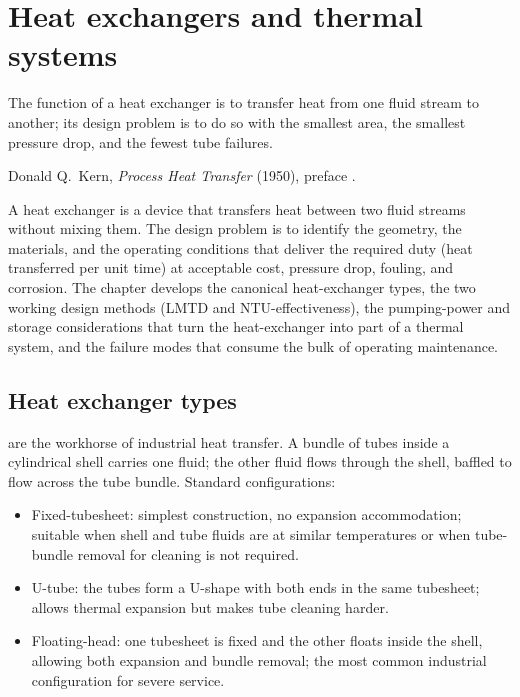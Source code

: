\chapter{Heat exchangers and thermal systems}
\label{vol04:ch06}

\epigraph{The function of a heat exchanger is to transfer heat from one
fluid stream to another; its design problem is to do so with the
smallest area, the smallest pressure drop, and the fewest tube
failures.}{Donald Q.\ Kern, \emph{Process Heat Transfer} (1950),
preface \cite[p.~v]{text:kern-process-heat}.}


\noindent
A heat exchanger is a device that transfers heat between two fluid
streams without mixing them. The design problem is to identify the
geometry, the materials, and the operating conditions that deliver
the required duty (heat transferred per unit time) at acceptable
cost, pressure drop, fouling, and corrosion. The chapter develops the
canonical heat-exchanger types, the two working design methods
(LMTD and NTU-effectiveness), the pumping-power and storage
considerations that turn the heat-exchanger into part of a thermal
system, and the failure modes that consume the bulk of operating
maintenance.

\section{Heat exchanger types}

 are the workhorse of industrial
heat transfer. A bundle of tubes inside a cylindrical shell carries
one fluid; the other fluid flows through the shell, baffled to flow
across the tube bundle. Standard configurations:

\begin{itemize}[leftmargin=*]
  \item Fixed-tubesheet: simplest construction, no expansion
    accommodation; suitable when shell and tube fluids are at similar
    temperatures or when tube-bundle removal for cleaning is not
    required.
  \item U-tube: the tubes form a U-shape with both ends in the same
    tubesheet; allows thermal expansion but makes tube cleaning
    harder.
  \item Floating-head: one tubesheet is fixed and the other floats
    inside the shell, allowing both expansion and bundle removal;
    the most common industrial configuration for severe service.
\end{itemize}

